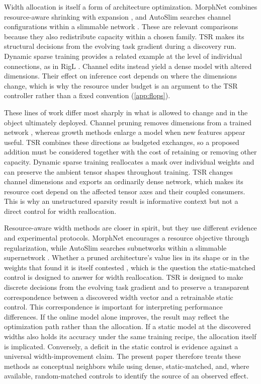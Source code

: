 \documentclass[10pt]{article}
\theoremstyle{paper}
\begin{document}
Width allocation is itself a form of architecture optimization. MorphNet combines resource-aware shrinking with expansion \citep{gordon2018morphnet}, and AutoSlim searches channel configurations within a slimmable network \citep{yu2020autoslim}. These are relevant comparisons because they also redistribute capacity within a chosen family. TSR makes its structural decisions from the evolving task gradient during a discovery run. Dynamic sparse training provides a related example at the level of individual connections, as in RigL \citep{evci2020rigging}. Channel edits instead yield a dense model with altered dimensions. Their effect on inference cost depends on where the dimensions change, which is why the resource under budget is an argument to the TSR controller rather than a fixed convention (\cref{app:flops}).

These lines of work differ most sharply in what is allowed to change and in the object ultimately deployed. Channel pruning removes dimensions from a trained network \citep{han2015learning,li2016pruning,he2017channel}, whereas growth methods enlarge a model when new features appear useful. TSR combines these directions as budgeted exchanges, so a proposed addition must be considered together with the cost of retaining or removing other capacity. Dynamic sparse training reallocates a mask over individual weights and can preserve the ambient tensor shapes throughout training. TSR changes channel dimensions and exports an ordinarily dense network, which makes its resource cost depend on the affected tensor axes and their coupled consumers. This is why an unstructured sparsity result is informative context but not a direct control for width reallocation.

Resource-aware width methods are closer in spirit, but they use different evidence and experimental protocols. MorphNet encourages a resource objective through regularization, while AutoSlim searches subnetworks within a slimmable supernetwork \citep{gordon2018morphnet,8822c3c89a3f4ee0bf3b01a679aabd6b,yu2020autoslim}. Whether a pruned architecture's value lies in its shape or in the weights that found it is itself contested \citep{liu2018rethinking,frankle2018lottery}, which is the question the static-matched control is designed to answer for width reallocation. TSR is designed to make discrete decisions from the evolving task gradient and to preserve a transparent correspondence between a discovered width vector and a retrainable static control. This correspondence is important for interpreting performance differences. If the online model alone improves, the result may reflect the optimization path rather than the allocation. If a static model at the discovered widths also holds its accuracy under the same training recipe, the allocation itself is implicated. Conversely, a deficit in the static control is evidence against a universal width-improvement claim. The present paper therefore treats these methods as conceptual neighbors while using dense, static-matched, and, where available, random-matched controls to identify the source of an observed effect.
\end{document}
